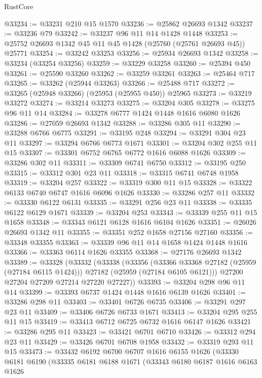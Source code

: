 \begin{lexlean}{RustCore}
\begin{coremodule}
@33234 := @33231 @210 @15 @1570
@33236 := @25862 @26693 @1342
@33237 := @33236 @79
@33242 := @33237 @96 @11 @14 @1428 @1448
@33253 := @25752 @26693 @1342 @45 @11 @45 @1428 (@25760 (@25761 @26693 @45)) @25771
@33254 := @33242 @33253
@33256 := @25934 @26693 @1342
@33258 := @33234 (@33254 @33256)
@33259 := @33229 @33258
@33260 := @25394 @450
@33261 := @25590 @33260
@33262 := @33259 @33261
@33263 := @25464 @717
@33265 := @33262 (@25944 @33263)
@33266 := @25488 @717
@33272 := @33265 (@25948 @33266) (@25953 (@25955 @450)) @25965
@33273 := @33219 @33272
@33274 := @33214 @33273
@33275 := @33204 @305
@33278 := @33275 @96 @11 @14
@33284 := @33278 @6777 @1424 @1448 @1616 @6080 @1626
@33286 := @27059 @26693 @1342
@33288 := @33286 @305 @11
@33290 := @33288 @6766 @6775
@33291 := @33195 @248
@33294 := @33291 @304 @23 @11
@33297 := @33294 @6766 @6773 @1671
@33301 := @33204 @302 @255 @11 @15
@33307 := @33301 @6752 @6765 @6772 @1616 @6088 @1626
@33309 := @33286 @302 @11
@33311 := @33309 @6741 @6750
@33312 := @33195 @250
@33315 := @33312 @301 @23 @11
@33318 := @33315 @6741 @6748 @1958
@33319 := @33204 @257
@33322 := @33319 @300 @11 @15
@33328 := @33322 @6133 @6740 @6747 @1616 @6096 @1626
@33330 := @33286 @257 @11
@33332 := @33330 @6122 @6131
@33335 := @33291 @256 @23 @11
@33338 := @33335 @6122 @6129 @1671
@33339 := @33204 @253
@33343 := @33339 @255 @11 @15 @1658
@33348 := @33343 @6121 @6128 @1616 @6104 @1626
@33351 := @26026 @26693 @1342 @11
@33355 := @33351 @252 @1658 @27156 @27160
@33356 := @33348 @33355
@33363 := @33339 @96 @11 @14 @1658 @1424 @1448 @1616
@33366 := @33363 @6114 @1626 @33355
@33368 := @27176 @26693 @1342
@33389 := @33328
    (@33332
      (@33338
        (@33356
          (@33366 @33368 @27182 (@25959 (@27184 @6115 @1424)))
          @27182
          (@25959 (@27184 @6105 @6121)))
        @27200
        @27204
        @27209
        @27214
        @27220
        @27227))
@33393 := @33204 @298 @96 @11 @14
@33399 := @33393 @6737 @1424 @1448 @1616 @6139 @1626
@33401 := @33286 @298 @11
@33403 := @33401 @6726 @6735
@33406 := @33291 @297 @23 @11
@33409 := @33406 @6726 @6733 @1671
@33413 := @33204 @295 @255 @11 @15
@33419 := @33413 @6712 @6725 @6732 @1616 @6147 @1626
@33421 := @33286 @295 @11
@33423 := @33421 @6701 @6710
@33426 := @33312 @294 @23 @11
@33429 := @33426 @6701 @6708 @1958
@33432 := @33319 @293 @11 @15
@33473 := @33432
    @6192
    @6700
    @6707
    @1616
    @6155
    @1626
    (@33330
      @6181
      @6190
      (@33335
        @6181
        @6188
        @1671
        (@33343
          @6180
          @6187
          @1616
          @6163
          @1626

\end{coremodule}
\end{lexlean}
